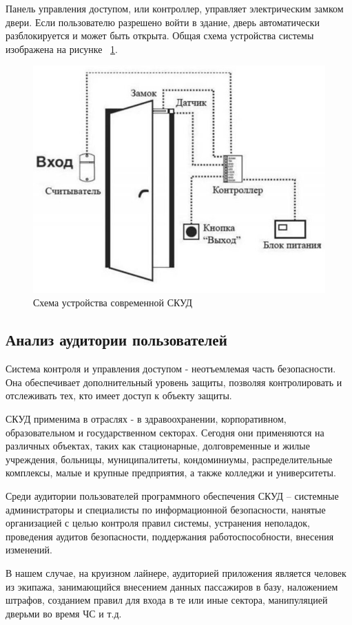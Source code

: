 Панель управления доступом, или контроллер, управляет электрическим замком двери. Если пользователю разрешено войти в здание, дверь автоматически разблокируется и может быть открыта.
Общая схема устройства системы изображена на рисунке ~\ref{fig:commonscheme1}.
\begin{figure}
	\centering
	\includegraphics[width=0.7\linewidth]{images/CommonScheme1}
	\caption{Схема устройства современной СКУД}
	\label{fig:commonscheme1}
\end{figure}

\subsection{Анализ аудитории пользователей}

Система контроля и управления доступом - неотъемлемая часть безопасности. Она обеспечивает дополнительный уровень защиты, позволяя контролировать и отслеживать тех, кто имеет доступ к объекту защиты.

СКУД применима в отраслях - в здравоохранении, корпоративном, образовательном и государственном секторах. Сегодня они применяются на различных объектах, таких как стационарные, долговременные и жилые учреждения, больницы, муниципалитеты, кондоминиумы, распределительные комплексы, малые и крупные предприятия, а также колледжи и университеты.

Среди аудитории пользователей программного обеспечения СКУД -- системные администраторы и специалисты по информационной безопасности, нанятые организацией с целью контроля правил системы, устранения неполадок, проведения аудитов безопасности, поддержания работоспособности, внесения изменений.

В нашем случае, на круизном лайнере, аудиторией приложения является человек из экипажа, занимающийся внесением данных пассажиров в базу, наложением штрафов, созданием правил для входа в те или иные сектора, манипуляцией дверьми во время ЧС и т.д.

